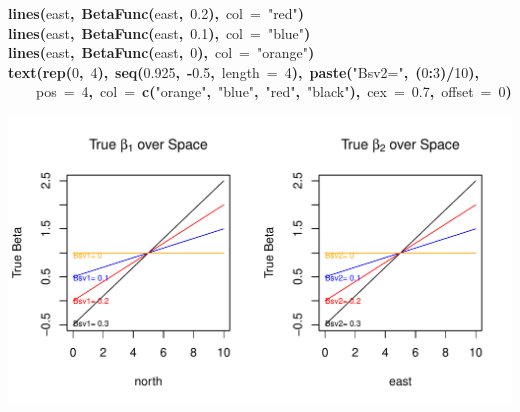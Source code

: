 \documentclass{article}
\makeatletter
\newcommand{\hlnumber}[1]{\textcolor[rgb]{0,0,0}{#1}}%
\newcommand{\hlfunctioncall}[1]{\textcolor[rgb]{0.501960784313725,0,0.329411764705882}{\textbf{#1}}}%
\newcommand{\hlstring}[1]{\textcolor[rgb]{0.6,0.6,1}{#1}}%
\newcommand{\hlkeyword}[1]{\textcolor[rgb]{0,0,0}{\textbf{#1}}}%
\newcommand{\hlargument}[1]{\textcolor[rgb]{0.690196078431373,0.250980392156863,0.0196078431372549}{#1}}%
\newcommand{\hlsymbol}[1]{\textcolor[rgb]{0,0,0}{#1}}%
\newcommand{\hlstd}[1]{\textcolor[rgb]{0,0,0}{#1}}%
\newenvironment{kframe}{%
 \def\FrameCommand##1{\hskip\@totalleftmargin \hskip-\fboxsep
 \colorbox{shadecolor}{##1}\hskip-\fboxsep
     \hskip-\linewidth \hskip-\@totalleftmargin \hskip\columnwidth}%
 \MakeFramed {\advance\hsize-\width
   \@totalleftmargin\z@ \linewidth\hsize
   \@setminipage}}%
 {\par\unskip\endMakeFramed}
\newenvironment{knitrout}{}{} %
\makeatother
\begin{document}
\begin{knitrout}
\begin{kframe}
\begin{flushleft}
\hlstd{}\hlfunctioncall{lines}\hlkeyword{(}\hlsymbol{east}\hlkeyword{,}{\ }\hlfunctioncall{BetaFunc}\hlkeyword{(}\hlsymbol{east}\hlkeyword{,}{\ }\hlnumber{0.2}\hlkeyword{)}\hlkeyword{,}{\ }\hlargument{col}{\ }\hlargument{=}{\ }\hlstring{"{}red"{}}\hlkeyword{)}\hspace*{\fill}\\
\hlstd{}\hlfunctioncall{lines}\hlkeyword{(}\hlsymbol{east}\hlkeyword{,}{\ }\hlfunctioncall{BetaFunc}\hlkeyword{(}\hlsymbol{east}\hlkeyword{,}{\ }\hlnumber{0.1}\hlkeyword{)}\hlkeyword{,}{\ }\hlargument{col}{\ }\hlargument{=}{\ }\hlstring{"{}blue"{}}\hlkeyword{)}\hspace*{\fill}\\
\hlstd{}\hlfunctioncall{lines}\hlkeyword{(}\hlsymbol{east}\hlkeyword{,}{\ }\hlfunctioncall{BetaFunc}\hlkeyword{(}\hlsymbol{east}\hlkeyword{,}{\ }\hlnumber{0}\hlkeyword{)}\hlkeyword{,}{\ }\hlargument{col}{\ }\hlargument{=}{\ }\hlstring{"{}orange"{}}\hlkeyword{)}\hspace*{\fill}\\
\hlstd{}\hlfunctioncall{text}\hlkeyword{(}\hlfunctioncall{rep}\hlkeyword{(}\hlnumber{0}\hlkeyword{,}{\ }\hlnumber{4}\hlkeyword{)}\hlkeyword{,}{\ }\hlfunctioncall{seq}\hlkeyword{(}\hlnumber{0.925}\hlkeyword{,}{\ }\hlkeyword{-}\hlnumber{0.5}\hlkeyword{,}{\ }\hlargument{length}{\ }\hlargument{=}{\ }\hlnumber{4}\hlkeyword{)}\hlkeyword{,}{\ }\hlfunctioncall{paste}\hlkeyword{(}\hlstring{"{}Bsv2="{}}\hlkeyword{,}{\ }\hlkeyword{(}\hlnumber{0}\hlkeyword{:}\hlnumber{3}\hlkeyword{)}\hlkeyword{/}\hlnumber{10}\hlkeyword{)}\hlkeyword{,}\hspace*{\fill}\\
\hlstd{}{\ }{\ }{\ }{\ }\hlargument{pos}{\ }\hlargument{=}{\ }\hlnumber{4}\hlkeyword{,}{\ }\hlargument{col}{\ }\hlargument{=}{\ }\hlfunctioncall{c}\hlkeyword{(}\hlstring{"{}orange"{}}\hlkeyword{,}{\ }\hlstring{"{}blue"{}}\hlkeyword{,}{\ }\hlstring{"{}red"{}}\hlkeyword{,}{\ }\hlstring{"{}black"{}}\hlkeyword{)}\hlkeyword{,}{\ }\hlargument{cex}{\ }\hlargument{=}{\ }\hlnumber{0.7}\hlkeyword{,}{\ }\hlargument{offset}{\ }\hlargument{=}{\ }\hlnumber{0}\hlkeyword{)}\mbox{}
\normalfont
\end{flushleft}
\end{kframe}\includegraphics{figure/unnamed-chunk-4} 
\end{knitrout}
\end{document}
